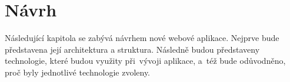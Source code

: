 \chapter{Návrh}
Následující kapitola se zabývá návrhem nové webové aplikace. Nejprve bude představena její architektura a struktura. Následně budou představeny technologie, které budou využity při~vývoji aplikace, a~též bude odůvodněno, proč byly jednotlivé technologie zvoleny.




